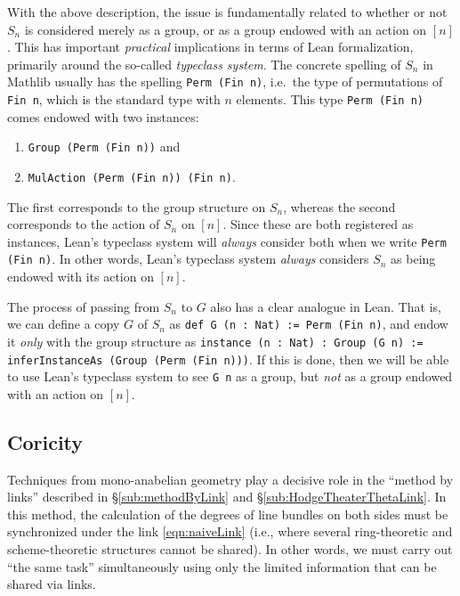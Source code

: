 \documentclass[12pt, reqno, a4paper]{amsart}
\begin{document}
\begin{rem}
With the above description, the issue is fundamentally related to whether or not $S_n$ is considered merely as a group, or as a group endowed with an action on $[n]$.
This has important \textit{practical} implications in terms of Lean formalization, primarily around the so-called \textit{typeclass system}.
The concrete spelling of $S_n$ in Mathlib usually has the spelling \texttt{Perm (Fin n)}, i.e.~the type of permutations of \texttt{Fin n}, which is the standard type with $n$ elements.
This type \texttt{Perm (Fin n)} comes endowed with two instances:
\begin{enumerate}
\item \texttt{Group (Perm (Fin n))} and
\item \texttt{MulAction (Perm (Fin n)) (Fin n)}.
\end{enumerate}
The first corresponds to the group structure on $S_n$, whereas the second corresponds to the action of $S_n$ on $[n]$.
Since these are both registered as instances, Lean's typeclass system will \textit{always} consider both when we write \texttt{Perm (Fin n)}.
In other words, Lean's typeclass system \textit{always} considers $S_n$ as being endowed with its action on $[n]$.

The process of passing from $S_n$ to $G$ also has a clear analogue in Lean.
That is, we can define a copy $G$ of $S_n$ as \texttt{def G (n\ :\ Nat)\ := Perm (Fin n)}, and endow it \textit{only} with the group structure as \texttt{instance (n\ :\ Nat)\ :\ Group (G n)\ := inferInstanceAs (Group (Perm (Fin n)))}.
If this is done, then we will be able to use Lean's typeclass system to see \texttt{G n} as a group, but \textit{not} as a group endowed with an action on $[n]$.
\end{rem}


\subsection{Coricity}\label{sub:coricity}
Techniques from mono-anabelian geometry play a decisive role in the ``method by links'' described in \S\ref{sub:methodByLink} and \S\ref{sub:HodgeTheaterThetaLink}. In this method, the calculation of the degrees of line bundles on both sides must be synchronized under the link \eqref{eqn:naiveLink} (i.e., where several ring-theoretic and scheme-theoretic structures cannot be shared). In other words, we must carry out ``the same task'' simultaneously using only the limited information that can be shared via links.
\end{document}

